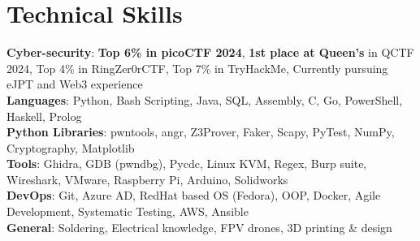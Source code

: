 \section{Technical Skills}

\begin{itemize}[leftmargin=0.15in, label={}]
    \small{\item{
        \textbf{Cyber-security}{: \textbf{Top 6\% in picoCTF 2024}, \textbf{1st place at Queen's} in QCTF 2024, Top 4\% in RingZer0rCTF, Top 7\% in TryHackMe, Currently pursuing eJPT and Web3 experience} \\ \vspace{1.5mm}
        \textbf{Languages}{: Python, Bash Scripting, Java, SQL, Assembly, C, Go, PowerShell, Haskell, Prolog} \\ \vspace{1.5mm}
        \textbf{Python Libraries}{: pwntools, angr, Z3Prover, Faker, Scapy, PyTest, NumPy, Cryptography, Matplotlib} \\ \vspace{1.5mm}
        \textbf{Tools}{: Ghidra, GDB (pwndbg), Pycdc, Linux KVM, Regex, Burp suite, Wireshark, VMware, Raspberry Pi, Arduino, Solidworks} \\ \vspace{1.5mm}
        \textbf{DevOps}{: Git, Azure AD, RedHat based OS (Fedora), OOP, Docker, Agile Development, Systematic Testing, AWS, Ansible}\\ \vspace{1.5mm}
        \textbf{General}{: Soldering, Electrical knowledge, FPV drones, 3D printing \& design}\\
    }}
\end{itemize}